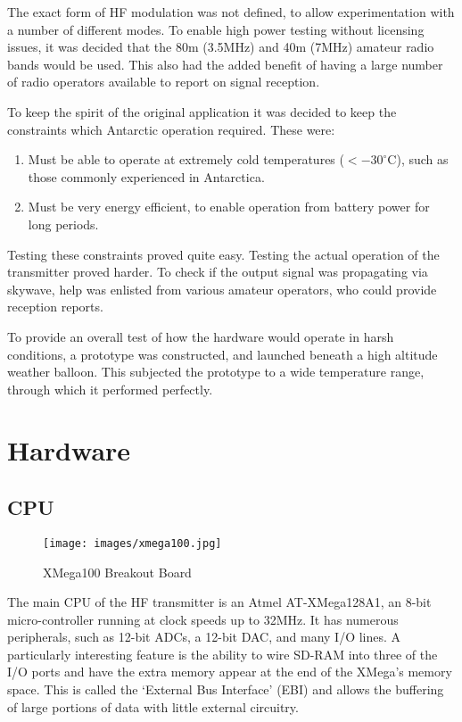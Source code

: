 \documentclass[a4paper,12pt]{article}
\begin{document}
The exact form of HF modulation was not defined, to allow experimentation with a number of different modes. To enable high power testing without licensing issues, it was decided that the 80m (3.5MHz) and 40m (7MHz) amateur radio bands would be used. This also had the added benefit of having a large number of radio operators available to report on signal reception.

To keep the spirit of the original application it was decided to keep the constraints which Antarctic operation required. These were:
\begin{enumerate}
\item Must be able to operate at extremely cold temperatures ($<-30^\circ$C), such as those commonly experienced in Antarctica.
\item Must be very energy efficient, to enable operation from battery power for long periods.
\end{enumerate}

Testing these constraints proved quite easy. Testing the actual operation of the transmitter proved harder. To check if the output signal was propagating via skywave, help was enlisted from various amateur operators, who could provide reception reports. 

To provide an overall test of how the hardware would operate in harsh conditions, a prototype was constructed, and launched beneath a high altitude weather balloon. This subjected the prototype to a wide temperature range, through which it performed perfectly.


\newpage
\section{Hardware}

\subsection{CPU}
\begin{wrapfigure}{r}{0.3\textwidth}
  \begin{center}
    \texttt{[image: images/xmega100.jpg]}
  \end{center}
  \caption{XMega100 Breakout Board}
  \label{fig:xmega100}
\end{wrapfigure}
The main CPU of the HF transmitter is an Atmel AT-XMega128A1, an 8-bit micro-controller running at clock speeds up to 32MHz. It has numerous peripherals, such as 12-bit ADCs, a 12-bit DAC, and many I/O lines\citep{ref:xmega}. A particularly interesting feature is the ability to wire SD-RAM into three of the I/O ports and have the extra memory appear at the end of the XMega's memory space. This is called the `External Bus Interface' (EBI) and allows the buffering of large portions of data with little external circuitry.
\end{document}
